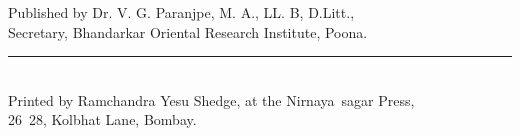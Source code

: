 \documentclass[11pt, openany]{book}
\begin{document}
\newpage
\thispagestyle{empty}

\vspace*{\fill}
\onehalfspacing
\begin{center}
Published by Dr. V. G. Paranjpe, M. A., LL. B, D.Litt.,\\

Secretary, Bhandarkar Oriental Research Institute, Poona.\\

\rule{0.3\linewidth}{0.5pt}\\

Printed by Ramchandra Yesu Shedge, at the {\qt Nirnaya\textendash\ sagar} Press,\\

26\textendash\ 28, Kolbhat Lane, Bombay.
\end{center}
\vspace*{\fill}
\onehalfspacing
\end{document}
